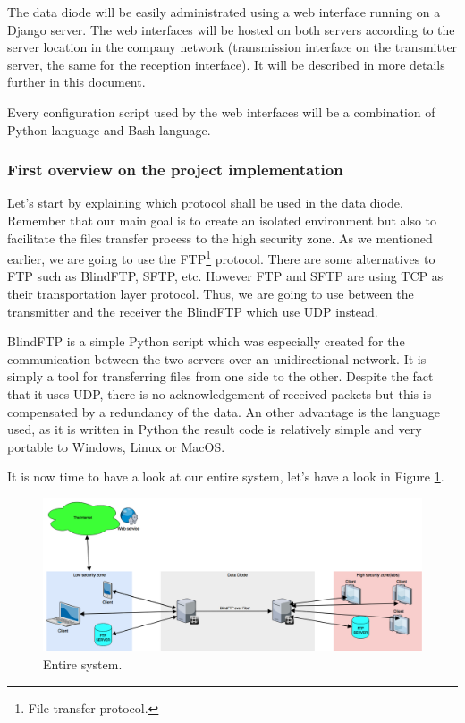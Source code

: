 \documentclass[a4paper,10pt]{article}
\begin{document}
The data diode will be easily administrated using a web interface running on a Django server. The web interfaces will be hosted on both servers according to the server location in the company network (transmission interface on the transmitter server, the same for the reception interface). It will be described in more details further in this document.

Every configuration script used by the web interfaces will be a combination of Python language and Bash language.
\subsubsection{First overview on the project implementation}

Let's start by explaining which protocol shall be used in the data diode. Remember that our main goal is to create an isolated environment but also to facilitate the files transfer process to the high security zone. As we mentioned earlier, we are going to use the FTP\footnote{File transfer protocol.} protocol. There are some alternatives to FTP such as BlindFTP, SFTP, etc. However FTP and SFTP are using TCP as their transportation layer protocol. Thus, we are going to use between the transmitter and the receiver the BlindFTP which use UDP instead.

BlindFTP is a simple Python script which was especially created for the communication between the two servers over an unidirectional network. It is simply a tool for transferring files from one side to the other. Despite the fact that it uses UDP, there is no acknowledgement of received packets but this is compensated by a redundancy of the data. An other advantage is the language used, as it is written in Python the result code is relatively simple and very portable to Windows, Linux or MacOS.

It is now time to have a look at our entire system, let's have a look in Figure \ref{fig:sysschem}.\bigskip

\begin{figure}
\centering
\includegraphics[scale=0.35]{images/systemschema.png}
\caption{Entire system.}
\label{fig:sysschem}
\end{figure}
\end{document}

